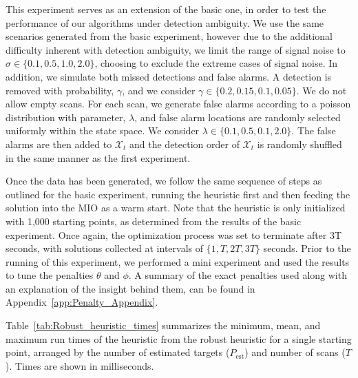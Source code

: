 This experiment serves as an extension of the basic one, in order to test the performance of our algorithms under detection ambiguity. We use the same scenarios generated from the basic experiment, however due to the additional difficulty inherent with detection ambiguity, we limit the range of signal noise to $\sigma \in \{0.1,0.5,1.0,2.0\}$, choosing to exclude the extreme cases of signal noise. In addition, we simulate both missed detections and false alarms. A detection is removed with probability, $\gamma$, and we consider $\gamma \in \{0.2,0.15,0.1,0.05\}$. We do not allow empty scans. For each scan, we generate false alarms according to a poisson distribution with parameter, $\lambda$, and false alarm locations are randomly selected uniformly within the state space. We consider $\lambda \in \{0.1,0.5,0.1,2.0\}$. The false alarms are then added to $\mathcal{X}_{t}$ and the detection order of $\mathcal{X}_{t}$ is randomly shuffled in the same manner as the first experiment. 

Once the data has been generated, we follow the same sequence of steps as outlined for the basic experiment, running the heuristic first and then feeding the solution into the MIO as a warm start. Note that the heuristic is only initialized with 1,000 starting points, as determined from the results of the basic experiment. Once again, the optimization process was set to terminate after 3T seconds, with solutions collected at intervals of $\{1,T,2T,3T\}$ seconds. Prior to the running of this experiment, we performed a mini experiment and used the results to tune the penalties $\theta$ and $\phi$. A summary of the exact penalties used along with an explanation of the insight behind them, can be found in Appendix~\ref{app:Penalty_Appendix}. 

 Table~\ref{tab:Robust_heuristic_times} summarizes the minimum, mean, and maximum run times of the heuristic from the robust heuristic for a single starting point, arranged by the number of estimated targets ($P_{\text{est}}$) and number of scans ($T$). Times are shown in milliseconds. 

